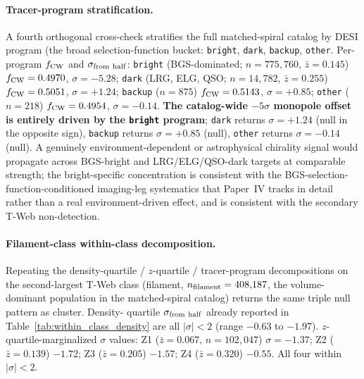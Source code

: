 \documentclass[aps,prd,twocolumn,superscriptaddress,showpacs,preprintnumbers,nofootinbib,longbibliography,floatfix]{revtex4-2}
\begin{document}
\paragraph{Tracer-program stratification.} A fourth orthogonal
cross-check stratifies the full matched-spiral catalog by DESI
program (the broad selection-function bucket: \texttt{bright},
\texttt{dark}, \texttt{backup}, \texttt{other}.
Per-program $f_{\rm CW}$ and $\sigma_{\rm from\ half}$:
\texttt{bright} (BGS-dominated; $n = 775{,}760$, $\bar z = 0.145$)
$f_{\rm CW} = 0.4970$, $\sigma = -5.28$; \texttt{dark} (LRG, ELG, QSO;
$n = 14{,}782$, $\bar z = 0.255$) $f_{\rm CW} = 0.5051$,
$\sigma = +1.24$; \texttt{backup} ($n = 875$) $f_{\rm CW} = 0.5143$,
$\sigma = +0.85$; \texttt{other} ($n = 218$) $f_{\rm CW} = 0.4954$,
$\sigma = -0.14$. \textbf{The catalog-wide $-5\sigma$ monopole offset is
entirely driven by the \texttt{bright} program}; \texttt{dark} returns
$\sigma = +1.24$ (null in the opposite sign), \texttt{backup} returns
$\sigma = +0.85$ (null), \texttt{other} returns $\sigma = -0.14$
(null). A genuinely environment-dependent or astrophysical chirality
signal would propagate across BGS-bright and LRG/ELG/QSO-dark targets
at comparable strength; the bright-specific concentration is consistent
with the BGS-selection-function-conditioned imaging-leg systematics
that Paper~IV tracks in detail rather than a real environment-driven
effect, and is consistent with the secondary T-Web non-detection.

\paragraph{Filament-class within-class decomposition.} Repeating the
density-quartile / $z$-quartile / tracer-program decompositions on
the second-largest T-Web class (filament, $n_{\rm filament} =
408{,}187$, the volume-dominant population in the matched-spiral
catalog) returns the same triple null pattern as cluster. Density-
quartile $\sigma_{\rm from\ half}$ already reported in
Table~\ref{tab:within_class_density} are all $|\sigma| < 2$ (range
$-0.63$ to $-1.97$). $z$-quartile-marginalized $\sigma$ values:
Z1 ($\bar z = 0.067$, $n = 102{,}047$) $\sigma = -1.37$;
Z2 ($\bar z = 0.139$) $-1.72$; Z3 ($\bar z = 0.205$) $-1.57$;
Z4 ($\bar z = 0.320$) $-0.55$. All four within $|\sigma| < 2$.
\end{document}
